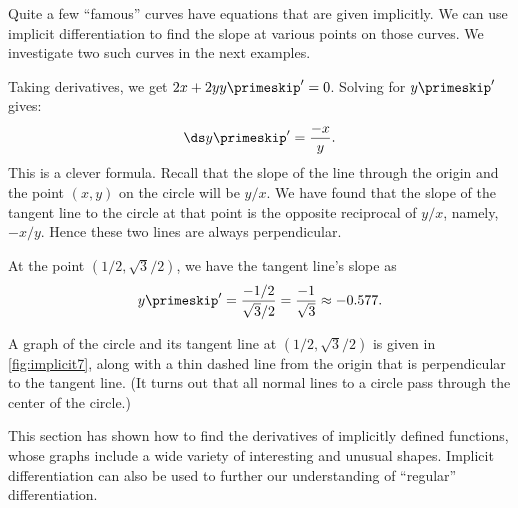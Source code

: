 Quite a few ``famous'' curves have equations that are given implicitly.  We can use implicit differentiation to find the slope at various points on those curves. We investigate two such curves in the next examples.\bigskip

{Taking derivatives, we get $2x+2yy\primeskip'=0$.  Solving for $y\primeskip'$  gives: \[\ds y\primeskip' = \frac{-x}{y}.\]
This is a clever formula. Recall that the slope of the line through the origin and the point $(x,y)$ on the circle will be $y/x$. We have found that the slope of the tangent line to the circle at that point is the opposite reciprocal of $y/x$, namely, $-x/y$. Hence these two lines are always perpendicular.

At the point $(1/2, \sqrt{3}/2)$, we have the tangent line's slope as
\[y\primeskip' = \frac{-1/2}{\sqrt{3}/2} = \frac{-1}{\sqrt{3}} \approx -0.577.\]

A graph of the circle and its tangent line at $(1/2,\sqrt{3}/2)$ is given in \autoref{fig:implicit7}, along with a thin dashed line from the origin that is perpendicular to the tangent line. (It turns out that all normal lines to a circle pass through the center of the circle.)

}

This section has shown how to find the derivatives of implicitly defined functions, whose graphs include a wide variety of interesting and unusual shapes. Implicit differentiation can also be used to further our understanding of ``regular'' differentiation. 

